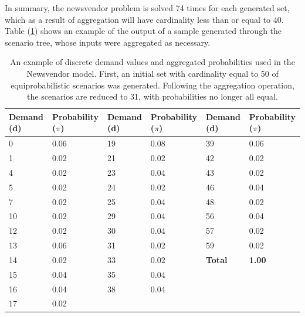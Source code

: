 \documentclass[a4paper,12pt]{article}
\begin{document}
	
	\noindent In summary, the newsvendor problem is solved 74 times for each generated set, which as a result of aggregation will have cardinality less than or equal to 40. Table (\ref{tab:newsvendor-general}) shows an example of the output of a sample generated through the scenario tree, whose inputs were aggregated as necessary.\\
	
	\begin{table}[H]
		\centering
		\footnotesize %
		\label{tab:newsvendor-general}
		\renewcommand{\arraystretch}{1.1}
		\begin{tabular}{|@{\hskip 2pt}p{1.5cm}@{\hskip 2pt}|@{\hskip 2pt}p{2.0cm}@{\hskip 2pt}||@{\hskip 2pt}p{1.5cm}@{\hskip 2pt}|@{\hskip 2pt}p{2.0cm}@{\hskip 2pt}||@{\hskip 2pt}p{1.5cm}@{\hskip 2pt}|@{\hskip 2pt}p{2.0cm}@{\hskip 2pt}|}
			\hline
			\textbf{Demand (d)} & \textbf{Probability ($\pi$)} & \textbf{Demand (d)} & \textbf{Probability ($\pi$)} & \textbf{Demand (d)} & \textbf{Probability ($\pi$)} \\
			\hline
			0 & 0.06 & 19 & 0.08 & 39 & 0.06 \\
			1 & 0.02 & 21 & 0.02 & 42 & 0.02 \\
			4 & 0.02 & 23 & 0.04 & 43 & 0.02 \\
			5 & 0.02 & 24 & 0.02 & 46 & 0.04 \\
			7 & 0.02 & 25 & 0.04 & 48 & 0.02 \\
			10 & 0.02 & 29 & 0.04 & 56 & 0.04 \\
			12 & 0.02 & 30 & 0.04 & 57 & 0.02 \\
			13 & 0.06 & 31 & 0.02 & 59 & 0.02 \\
			14 & 0.02 & 33 & 0.02 & \textbf{Total} & \textbf{1.00} \\
			15 & 0.04 & 35 & 0.04 & & \\
			16 & 0.04 & 38 & 0.04 & & \\
			17 & 0.02 & & & & \\
			\hline
		\end{tabular}
		\caption{An example of discrete demand values and aggregated probabilities used in the Newsvendor model. First, an initial set with cardinality equal to 50 of equiprobabilistic scenarios was generated. Following the aggregation operation, the scenarios are reduced to 31, with probabilities no longer all equal.}
	\end{table}
	
\end{document}
